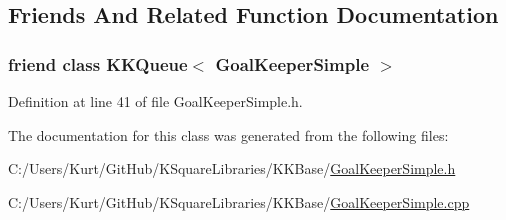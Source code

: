 \subsection{Friends And Related Function Documentation}
\subsubsection[{\texorpdfstring{K\+K\+Queue$<$ Goal\+Keeper\+Simple $>$}{KKQueue< GoalKeeperSimple >}}]{\setlength{\rightskip}{0pt plus 5cm}friend class {\bf K\+K\+Queue}$<$ {\bf Goal\+Keeper\+Simple} $>$\hspace{0.3cm}{\ttfamily [friend]}}\hypertarget{class_k_k_b_1_1_goal_keeper_simple_a3c22ebe8b841379f92ef7cdfe3aed61c}{}\label{class_k_k_b_1_1_goal_keeper_simple_a3c22ebe8b841379f92ef7cdfe3aed61c}


Definition at line 41 of file Goal\+Keeper\+Simple.\+h.



The documentation for this class was generated from the following files\+:\begin{DoxyCompactItemize}
\item 
C\+:/\+Users/\+Kurt/\+Git\+Hub/\+K\+Square\+Libraries/\+K\+K\+Base/\hyperlink{_goal_keeper_simple_8h}{Goal\+Keeper\+Simple.\+h}\item 
C\+:/\+Users/\+Kurt/\+Git\+Hub/\+K\+Square\+Libraries/\+K\+K\+Base/\hyperlink{_goal_keeper_simple_8cpp}{Goal\+Keeper\+Simple.\+cpp}\end{DoxyCompactItemize}
